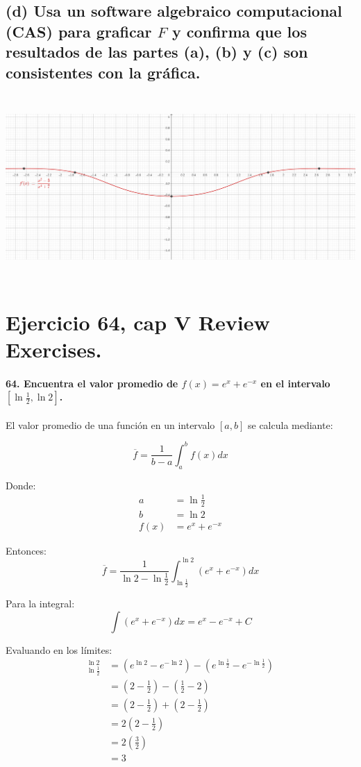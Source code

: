 \documentclass[11pt,letterpaper]{article}
\begin{document}
\subsection*{(d) Usa un software algebraico computacional (CAS) para graficar \( F \) y confirma que los resultados de las partes (a), (b) y (c) son consistentes con la gráfica.}

\includegraphics[height=7cm]{./imagenes/ej56.png}

\section{Ejercicio 64, cap V Review Exercises.}
\paragraph*{64. Encuentra el valor promedio de \( f(x) = e^x + e^{-x} \) en el intervalo \([ \ln\frac{1}{2}, \ln 2 ]\).}
El valor promedio de una función en un intervalo $[a,b]$ se calcula mediante:

$$\overline{f}=\frac{1}{b-a}\int_a^b f(x)dx$$

Donde:
\begin{align*}
a &= \ln \frac{1}{2} \\
b &= \ln 2 \\
f(x) &= e^x + e^{-x}
\end{align*}

Entonces:
$$\overline{f}=\frac{1}{\ln 2-\ln \frac{1}{2}}\int_{\ln \frac{1}{2}}^{\ln 2} (e^x+e^{-x})dx$$

Para la integral:
$$\int (e^x+e^{-x})dx = e^x-e^{-x}+C$$

Evaluando en los límites:
\begin{align*}
[e^x-e^{-x}]_{\ln \frac{1}{2}}^{\ln 2} &= (e^{\ln 2}-e^{-\ln 2})-(e^{\ln \frac{1}{2}}-e^{-\ln \frac{1}{2}}) \\
&= (2-\frac{1}{2})-(\frac{1}{2}-2) \\
&= (2-\frac{1}{2})+(2-\frac{1}{2}) \\
&= 2(2-\frac{1}{2}) \\
&= 2(\frac{3}{2}) \\
&= 3
\end{align*}
\end{document}
